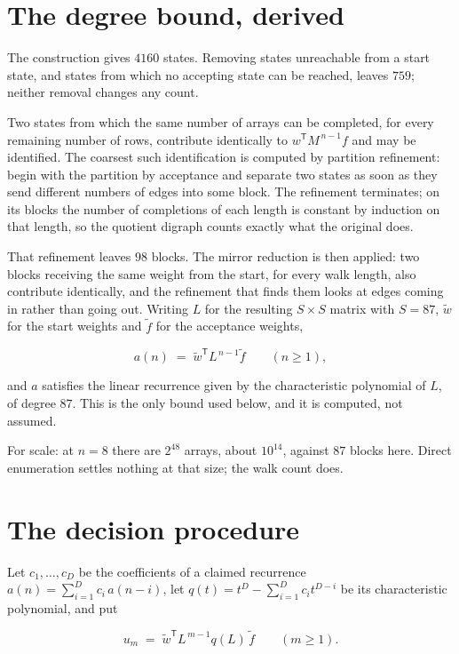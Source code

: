 \documentclass[11pt]{article}
\theoremstyle{definition}
\begin{document}
\section{The degree bound, derived}

The construction gives $4160$ states. Removing states unreachable from a start state, and states from which no accepting state can be reached, leaves $759$; neither removal changes any count.

Two states from which the same number of arrays can be completed, for every remaining number of rows, contribute identically to $w^{\mathsf T}M^{\,n-1}f$ and may be identified. The coarsest such identification is computed by partition refinement: begin with the partition by acceptance and separate two states as soon as they send different numbers of edges into some block. The refinement terminates; on its blocks the number of completions of each length is constant by induction on that length, so the quotient digraph counts exactly what the original does.

That refinement leaves $98$ blocks. The mirror reduction is then applied: two blocks receiving the same weight from the start, for every walk length, also contribute identically, and the refinement that finds them looks at edges coming in rather than going out. Writing $L$ for the resulting $S \times S$ matrix with $S = 87$, $\tilde w$ for the start weights and $\tilde f$ for the acceptance weights,

\[a(n) \;=\; \tilde w^{\mathsf T} L^{\,n-1} \tilde f \qquad (n \ge 1),\]

and $a$ satisfies the linear recurrence given by the characteristic polynomial of $L$, of degree $87$. This is the only bound used below, and it is computed, not assumed.

For scale: at $n = 8$ there are $2^{48}$ arrays, about $10^{14}$, against $87$ blocks here. Direct enumeration settles nothing at that size; the walk count does.

\section{The decision procedure}

Let $c_1,\dots,c_D$ be the coefficients of a claimed recurrence $a(n) = \sum_{i=1}^{D} c_i\,a(n-i)$, let $q(t) = t^{D} - \sum_{i=1}^{D} c_i t^{D-i}$ be its characteristic polynomial, and put

\[u_m \;=\; \tilde w^{\mathsf T} L^{\,m-1} q(L)\,\tilde f \qquad (m \ge 1).\]
\end{document}
